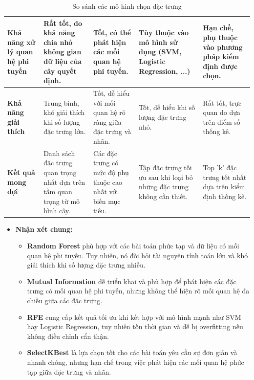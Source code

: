 \documentclass[13pt]{article}
\begin{document}
\begin{table}[h!]
\begin{tabular}{|p{2cm}|p{3cm}|p{3cm}|p{3cm}|p{3cm}|}
\hline
\textbf{Khả năng xử lý quan hệ phi tuyến} & Rất tốt, do khả năng chia nhỏ không gian dữ liệu của cây quyết định. & Tốt, có thể phát hiện các mối quan hệ phi tuyến. & Tùy thuộc vào mô hình sử dụng (SVM, Logistic Regression, ...) & Hạn chế, phụ thuộc vào phương pháp kiểm định được chọn.\\
\hline
\textbf{Khả năng giải thích} & Trung bình, khó giải thích khi số lượng đặc trưng lớn. & Tốt, dễ hiểu với mối quan hệ rõ ràng giữa đặc trưng và nhãn. & Tốt, dễ hiểu khi số lượng đặc trưng nhỏ. & Rất tốt, trực quan do dựa trên điểm số thống kê. \\
\hline
\textbf{Kết quả mong đợi} & Danh sách đặc trưng quan trọng nhất dựa trên tầm quan trọng từ mô hình cây. & Các đặc trưng có mức độ phụ thuộc cao nhất với biến mục tiêu. & Tập đặc trưng tối ưu sau khi loại bỏ những đặc trưng không cần thiết. & Top 'k' đặc trưng tốt nhất dựa trên kiểm định thống kê.\\
\hline
\end{tabular}
\caption{So sánh các mô hình chọn đặc trưng}
\label{tab:comparison}
\end{table}

\newpage
\begin{itemize}
    \item \textbf{Nhận xét chung: }
    \begin{itemize}
        \item \textbf{Random Forest} phù hợp với các bài toán phức tạp và dữ liệu có mối quan hệ phi tuyến. Tuy nhiên, nó đòi hỏi tài nguyên tính toán lớn và khó giải thích khi số lượng đặc trưng nhiều.
        \item \textbf{Mutual Information} dễ triển khai và phù hợp để phát hiện các đặc trưng có mối quan hệ phi tuyến, nhưng không thể hiện rõ mối quan hệ đa chiều giữa các đặc trưng.
        \item \textbf{RFE} cung cấp kết quả tối ưu khi kết hợp với mô hình mạnh như SVM hay Logistic Regression, tuy nhiên tốn thời gian và dễ bị overfitting nếu không điều chỉnh cẩn thận.
        \item \textbf{SelectKBest} là lựa chọn tốt cho các bài toán yêu cầu sự đơn giản và nhanh chóng, nhưng hạn chế trong việc phát hiện các mối quan hệ phức tạp giữa đặc trưng và nhãn.
    \end{itemize}
\end{itemize}
\end{document}
